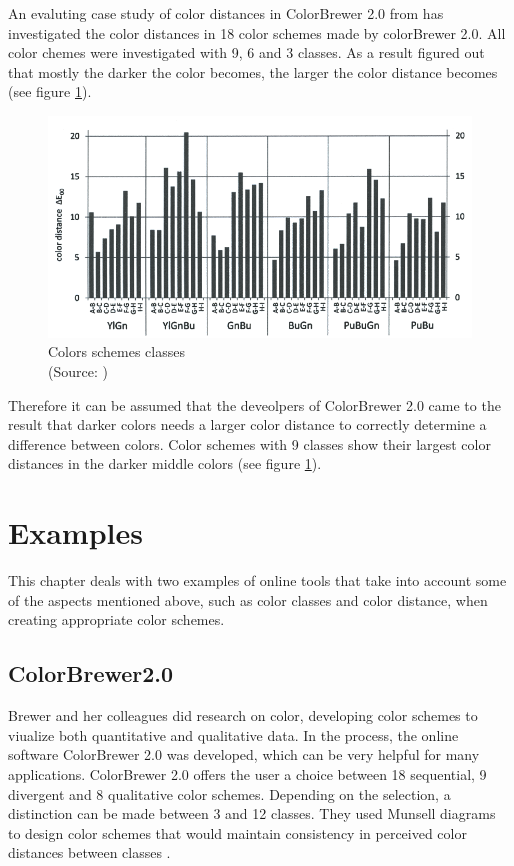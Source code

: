An evaluting case study of color distances in ColorBrewer 2.0 from \textcite{brychtovaC2017} has investigated the color distances in 18 color schemes made by colorBrewer 2.0. All color chemes were investigated with 9, 6 and 3 classes. As a result \textcite{brychtovaC2017} figured out that mostly the darker the color becomes, the larger the color distance becomes (see figure \ref{fig:colordist}).

\begin{figure}[h!]
	\centering
	\includegraphics[width=0.7\linewidth]{source/images/colordist}
	\caption{Colors schemes classes \\
		(Source: \textcite{brychtovaC2017})}
	\label{fig:colordist}
\end{figure}

Therefore it can be assumed that the deveolpers of ColorBrewer 2.0 came to the result that darker colors needs a larger color distance to correctly determine a difference between colors. Color schemes with 9 classes show their largest color distances in the darker middle colors (see figure \ref{fig:colordist}).

\section{Examples}
This chapter deals with two examples of online tools that take into account some of the aspects mentioned above, such as color classes and color distance, when creating appropriate color schemes. 

\subsection{ColorBrewer2.0}
Brewer and her colleagues \parencite{brewer2003, brewer1994, brewer1996, brewer1997, brewer1999} did research on color, developing color schemes to viualize both quantitative and qualitative data. In the process, the online software ColorBrewer 2.0 was developed, which can be very helpful for many applications. ColorBrewer 2.0 offers the user a choice between 18 sequential, 9 divergent and 8 qualitative color schemes. Depending on the selection, a distinction can be made between 3 and 12 classes. They used Munsell diagrams to design color schemes that would maintain consistency in perceived color distances between classes \parencite{brychtovaC2017}. 

